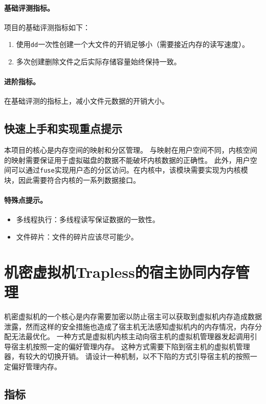 \paragraph*{基础评测指标。}
项目的基础评测指标如下：
\begin{enumerate}
    \item 使用\texttt{dd}一次性创建一个大文件的开销足够小（需要接近内存的读写速度）。
    \item 多次创建删除文件之后实际存储容量始终保持一致。
\end{enumerate}


\paragraph*{进阶指标。}
在基础评测的指标上，减小文件元数据的开销大小。

\subsection{快速上手和实现重点提示}
本项目的核心是内存空间的映射和分区管理。
与映射在用户空间不同，内核空间的映射需要保证用于虚拟磁盘的数据不能破坏内核数据的正确性。
此外，用户空间可以通过\texttt{fuse}实现用户态的分区访问。在内核中，该模块需要实现为内核模块，因此需要符合内核的一系列数据接口。

\paragraph*{特殊点提示。}
\begin{itemize}
    \item 多线程执行：多线程读写保证数据的一致性。
    \item 文件碎片：文件的碎片应该尽可能少。
\end{itemize}

\section{机密虚拟机Trapless的宿主协同内存管理}
机密虚拟机的一个核心是内存需要加密以防止宿主可以获取到虚拟机内存造成数据泄露，然而这样的安全措施也造成了宿主机无法感知虚拟机内的内存情况，内存分配无法最优化。
一种方式是虚拟机内核主动向宿主机的虚拟机管理器发起调用引导宿主机按照一定的偏好管理内存。
这种方式需要下陷到宿主机的虚拟机管理器，有较大的切换开销。
请设计一种机制，以不下陷的方式引导宿主机的按照一定偏好管理内存。



\subsection{指标}
